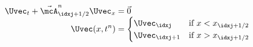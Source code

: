 \begin{defnbox}\nospacing
    \begin{defn}\label{defn:locally_linearized_riemann_problem_approximation}
        \begin{align}
            \begin{aligned}
            \Uvec_{t}+\linfluxvec_{\idxj+1/2}^{n}\Uvec_{x}&=\vec{0}\\[-1.5\jot]
            \Uvec(x,t^{n})&=\begin{cases}
                    \Uvec_{\idxj}&\text{if }x<x_{\idxj+1/2} \\
                    \Uvec_{\idxj+1}&\text{if }x>x_{\idxj+1/2}
            \end{cases}
            \end{aligned}\label{eq:riemann_problem_nonlinear_systems_of_conservation_laws}
        \end{align}
    \end{defn}
\end{defnbox}
